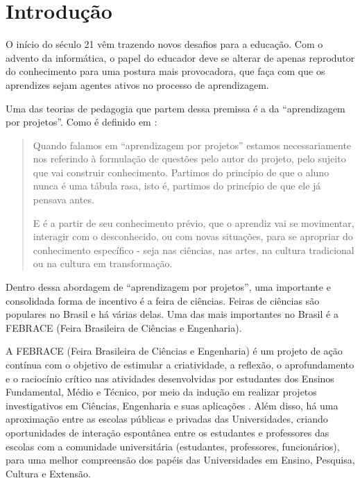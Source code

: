 
\chapter{Introdução}

O início do século 21 vêm trazendo novos desafios para a educação. Com o advento da informática, o papel do educador deve se alterar de apenas reprodutor do conhecimento para uma postura mais provocadora, que faça com que os aprendizes sejam agentes ativos no processo de aprendizagem. 

Uma das teorias de pedagogia que partem dessa premissa é a da “aprendizagem por projetos”. Como é definido em :

\begin{quotation}
    Quando falamos em “aprendizagem por projetos” estamos necessariamente nos referindo à formulação de questões pelo autor do projeto, pelo sujeito que vai construir conhecimento. Partimos do princípio de que o aluno nunca é uma tábula rasa, isto é, partimos do princípio de que ele já pensava antes.

    E é a partir de seu conhecimento prévio, que o aprendiz vai se movimentar, interagir com o desconhecido, ou com novas situações, para se apropriar do conhecimento específico - seja nas ciências, nas artes, na cultura tradicional ou na cultura em transformação.
\end{quotation}

Dentro dessa abordagem de “aprendizagem por projetos”, uma importante e consolidada forma de incentivo é a feira de ciências. Feiras de ciências são populares no Brasil e há várias delas. Uma das mais importantes no Brasil é a FEBRACE (Feira Brasileira de Ciências e Engenharia).

A FEBRACE (Feira Brasileira de Ciências e Engenharia) é um projeto de ação contínua com o objetivo de estimular a criatividade, a reflexão, o aprofundamento e o raciocínio crítico nas atividades desenvolvidas por estudantes dos Ensinos Fundamental, Médio e Técnico, por meio da indução em realizar projetos investigativos em Ciências, Engenharia e suas aplicações \cite{lopes07}. Além disso, há uma aproximação entre as escolas públicas e privadas das Universidades, criando oportunidades de interação espontânea entre os estudantes e professores das escolas com a comunidade universitária (estudantes, professores, funcionários), para uma melhor compreensão dos papéis das Universidades em Ensino, Pesquisa, Cultura e Extensão. 

